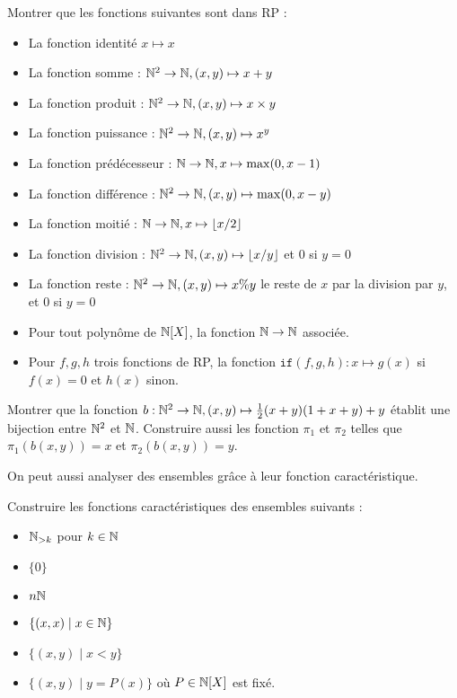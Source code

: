 \begin{exo}
    Montrer que les fonctions suivantes sont dans RP :
    \begin{itemize}[label=$\bullet$]
        \item La fonction identité $x \mapsto x$
        \item La fonction somme : $\mathbb{N}^2\to\mathbb{N}, (x,y)\mapsto x+y$
        \item La fonction produit : $\mathbb{N}^2\to\mathbb{N}, (x,y)\mapsto x\times y$
        \item La fonction puissance : $\mathbb{N}^2\to\mathbb{N}, (x,y)\mapsto x^y$
        \item La fonction prédécesseur : $\mathbb{N}\to\mathbb{N}, x \mapsto \max(0,x-1)$
        \item La fonction différence : $\mathbb{N}^2\to\mathbb{N}, (x,y)\mapsto \max(0,x-y)$
        \item La fonction moitié : $\mathbb{N}\to\mathbb{N},x \mapsto \lfloor x/2\rfloor$
        \item La fonction division : $\mathbb{N}^2\to\mathbb{N}, (x,y)\mapsto \lfloor x/y\rfloor$ et $0$ si $y=0$
        \item La fonction reste : $\mathbb{N}^2\to\mathbb{N}, (x,y)\mapsto x\%y$ le reste de $x$ par la division par $y$, et $0$ si $y=0$
        \item Pour tout polynôme de $\mathbb{N}[X]$, la fonction $\mathbb{N}\to\mathbb{N}$ associée.
        \item Pour $f,g,h$ trois fonctions de RP, la fonction $\texttt{if}(f,g,h) : x \mapsto g(x)$ si $f(x)=0$ et $h(x)$ sinon.
    \end{itemize}
\end{exo}

\begin{exo}\label{exo:bij}
    Montrer que la fonction $b : \mathbb{N}^2\to\mathbb{N}, (x,y)\mapsto \frac{1}{2}(x+y)(1+x+y)+y$ établit une bijection entre $\mathbb{N}^2$ et $\mathbb{N}$. Construire aussi les fonction $\pi_1$ et $\pi_2$ telles que $\pi_1(b(x,y))=x$ et $\pi_2(b(x,y))=y$.
\end{exo}

On peut aussi analyser des ensembles grâce à leur fonction caractéristique.

\begin{exo}
    Construire les fonctions caractéristiques des ensembles suivants :
    \begin{itemize}[label=$\bullet$]
        \item $\mathbb{N}_{>k}$ pour $k\in\mathbb{N}$
        \item $\{0\}$
        \item $n\mathbb{N}$
        \item $\{(x,x)\mid x\in\mathbb{N}\}$
        \item $\{(x,y)\mid x < y\}$
        \item $\{(x,y)\mid y=P(x)\}$ où $P\in\mathbb{N}[X]$ est fixé.
    \end{itemize}
\end{exo}

